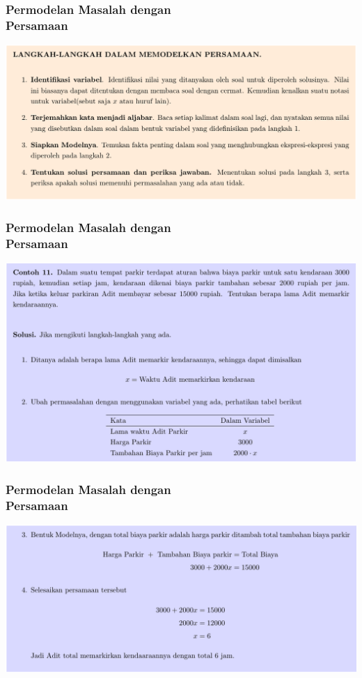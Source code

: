 \documentclass[pdflatex,compress,mathserif]{beamer}
\begin{document}
\begin{frame}
	\frametitle{Permodelan Masalah dengan\\Persamaan}
	\begin{center}
		\includegraphics[width=\linewidth]{img/img24}
	\end{center}
\end{frame}

\begin{frame}
	\frametitle{Permodelan Masalah dengan\\Persamaan}
	\begin{center}
		\includegraphics[width=\linewidth]{img/img25}
	\end{center}
\end{frame}

\begin{frame}
	\frametitle{Permodelan Masalah dengan\\Persamaan}
	\begin{center}
		\includegraphics[width=\linewidth]{img/img26}
	\end{center}
\end{frame}
\end{document}
